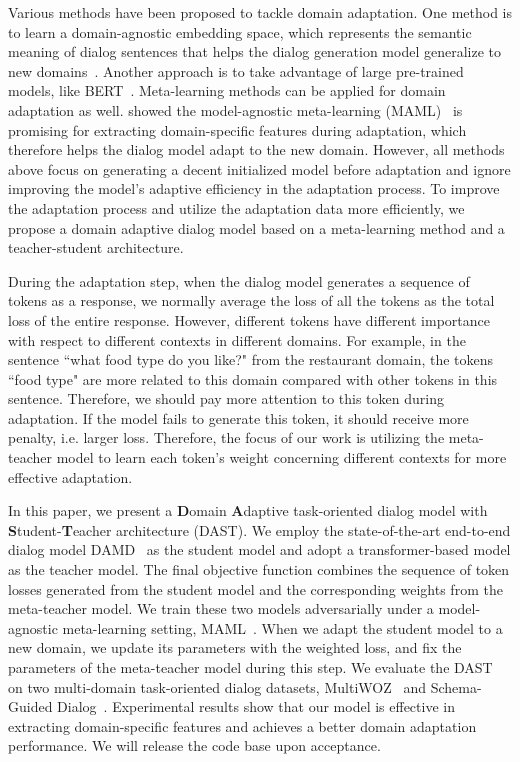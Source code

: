 \documentclass[letterpaper]{article}
\begin{document}
Various methods have been proposed to tackle domain adaptation.
One method is to learn a domain-agnostic embedding space, which represents the semantic meaning of dialog sentences that helps the dialog generation model generalize to new domains~\citep{zhao2018zero}.
Another approach is to take advantage of large pre-trained models, like BERT~\citep{Devlin2019BERTPO}.
Meta-learning methods can be applied for domain adaptation as well.  \citet{qian2019domain} showed the model-agnostic meta-learning  (MAML)~\citep{finn2017model} is promising for extracting domain-specific features during adaptation, which therefore helps the dialog model adapt to the new domain.
However, all methods above focus on generating a decent initialized model before adaptation and ignore improving the model's adaptive efficiency in the adaptation process.
To improve the adaptation process and utilize the adaptation data more efficiently, we propose a domain adaptive dialog model based on a meta-learning method and a teacher-student architecture.

During the adaptation step, when the dialog model generates a sequence of tokens as a response, we normally average the loss of all the tokens as the total loss of the entire response.
However, different tokens have different importance with respect to different contexts in different domains.
For example, in the sentence ``what food type do you like?" from the restaurant domain, the tokens ``food type" are more related to this domain compared with other tokens in this sentence.
Therefore, we should pay more attention to this token during adaptation.  If the model fails to generate this token, it should receive more penalty, i.e. larger loss.
Therefore, the focus of our work is utilizing the meta-teacher model to learn each token's weight concerning different contexts for more effective adaptation.



In this paper, we present a \textbf{D}omain \textbf{A}daptive task-oriented dialog model  with \textbf{S}tudent-\textbf{T}eacher architecture (DAST).
We employ the state-of-the-art end-to-end dialog model DAMD~\citep{zhang2019task} as the student model and adopt a transformer-based model as the teacher model.
The final objective function combines the sequence of token losses generated from the student model and the corresponding weights from the meta-teacher model.
We train these two models adversarially under a model-agnostic meta-learning setting, MAML~\citep{finn2017model}.
When we adapt the student model to a new domain, we update its parameters with the weighted loss, and fix the parameters of the meta-teacher model during this step.
We evaluate the DAST on two multi-domain task-oriented dialog datasets,  MultiWOZ~\citep{budzianowski2018multiwoz} and  Schema-Guided Dialog~\citep{rastogi2019towards}.
Experimental results show that our model is effective in extracting domain-specific features and achieves a better domain adaptation performance.
We will release the code base upon acceptance.
\end{document}
